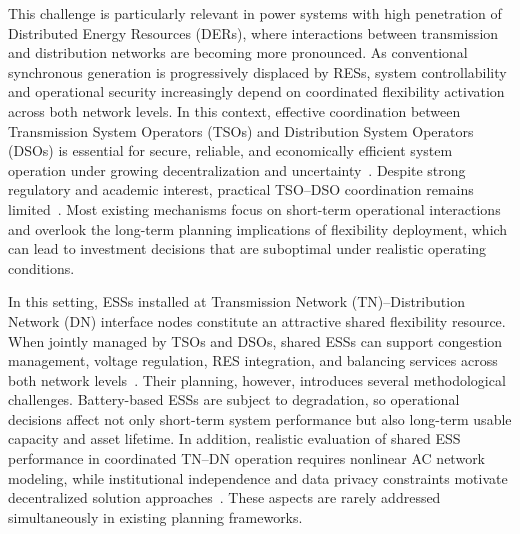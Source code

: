 \documentclass[preprint,12pt]{elsarticle}
\begin{document}
This challenge is particularly relevant in power systems with high penetration of Distributed Energy Resources (DERs), where interactions between transmission and distribution networks are becoming more pronounced. As conventional synchronous generation is progressively displaced by RESs, system controllability and operational security increasingly depend on coordinated flexibility activation across both network levels. In this context, effective coordination between Transmission System Operators (TSOs) and Distribution System Operators (DSOs) is essential for secure, reliable, and economically efficient system operation under growing decentralization and uncertainty~\cite{eu_regulation_2017,eu_regulation_2019}. 
Despite strong regulatory and academic interest, practical TSO--DSO coordination remains limited~\cite{cadre_2019}. Most existing mechanisms focus on short-term operational interactions and overlook the long-term planning implications of flexibility deployment, which can lead to investment decisions that are suboptimal under realistic operating conditions.

In this setting, ESSs installed at Transmission Network (TN)--Distribution Network (DN) interface nodes constitute an attractive shared flexibility resource. When jointly managed by TSOs and DSOs, shared ESSs can support congestion management, voltage regulation, RES integration, and balancing services across both network levels~\cite{simoes_2025}. Their planning, however, introduces several methodological challenges. Battery-based ESSs are subject to degradation, so operational decisions affect not only short-term system performance but also long-term usable capacity and asset lifetime. In addition, realistic evaluation of shared ESS performance in coordinated TN--DN operation requires nonlinear AC network modeling, while institutional independence and data privacy constraints motivate decentralized solution approaches~\cite{capitanescu_2016,usman_2023}. These aspects are rarely addressed simultaneously in existing planning frameworks.
\end{document}
